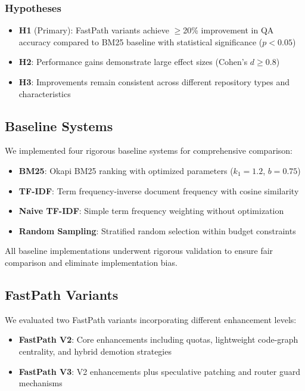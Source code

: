 \documentclass[conference]{IEEEtran}
\begin{document}
\subsubsection{Hypotheses}
\begin{itemize}
    \item \textbf{H1} (Primary): FastPath variants achieve $\geq$20\% improvement in QA accuracy compared to BM25 baseline with statistical significance ($p < 0.05$)
    \item \textbf{H2}: Performance gains demonstrate large effect sizes (Cohen's $d \geq 0.8$)
    \item \textbf{H3}: Improvements remain consistent across different repository types and characteristics
\end{itemize}

\subsection{Baseline Systems}
\label{subsec:baselines}

We implemented four rigorous baseline systems for comprehensive comparison:

\begin{itemize}
    \item \textbf{BM25}: Okapi BM25 ranking with optimized parameters ($k_1 = 1.2$, $b = 0.75$)
    \item \textbf{TF-IDF}: Term frequency-inverse document frequency with cosine similarity
    \item \textbf{Naive TF-IDF}: Simple term frequency weighting without optimization
    \item \textbf{Random Sampling}: Stratified random selection within budget constraints
\end{itemize}

All baseline implementations underwent rigorous validation to ensure fair comparison and eliminate implementation bias.

\subsection{FastPath Variants}
\label{subsec:fastpath_variants}

We evaluated two FastPath variants incorporating different enhancement levels:

\begin{itemize}
    \item \textbf{FastPath V2}: Core enhancements including quotas, lightweight code-graph centrality, and hybrid demotion strategies
    \item \textbf{FastPath V3}: V2 enhancements plus speculative patching and router guard mechanisms
\end{itemize}
\end{document}
